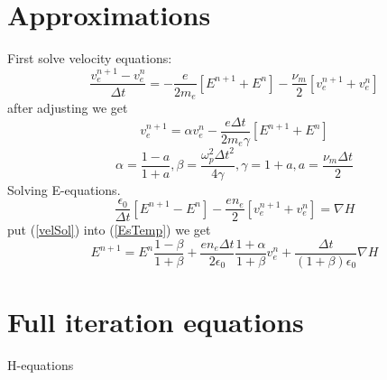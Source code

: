 \documentclass[a4paper,10pt]{article}
\begin{document}
\section{Approximations}
First solve velocity equations:
\begin{equation}
\frac{v_{e}^{n+1}-v_{e}^{n}}{\Delta t}=
-\frac{e}{2m_{e}}\left[E^{n+1}+E^{n}\right]
-\frac{\nu_{m}}{2}\left[v_{e}^{n+1}+v_{e}^{n}\right]
\end{equation}
after adjusting we get
\begin{equation}\label{velSol}
v_{e}^{n+1}=\alpha v_{e}^{n}-\frac{e\Delta t}{2m_{e}\gamma}\left[E^{n+1}+E^{n}\right]
\end{equation}
\begin{equation}\label{tempEqu}
\alpha=\frac{1-a}{1+a},\beta=\frac{\omega_{p}^{2}{\Delta t}^{2}}{4\gamma},\gamma=1+a,a=\frac{\nu_{m}\Delta t}{2}
\end{equation}
Solving E-equations.
\begin{equation}\label{EsTemp}
\frac{\epsilon_{0}}{\Delta t}\left[E^{n+1}-E^{n}\right]
-\frac{e n_{e}}{2}\left[v_{e}^{n+1}+v_{e}^{n}\right]=\nabla H
\end{equation}
put (\ref{velSol}) into (\ref{EsTemp}) we get
\begin{equation}
E^{n+1}=E^{n}\frac{1-\beta}{1+\beta}+\frac{e n_{e}\Delta t}{2\epsilon_{0}}\frac{1+\alpha}{1+\beta}v_{e}^{n}+\frac{\Delta t}{(1+\beta)\epsilon_{0}}\nabla H
\end{equation}
\section{Full iteration equations}
H-equations
\end{document}
